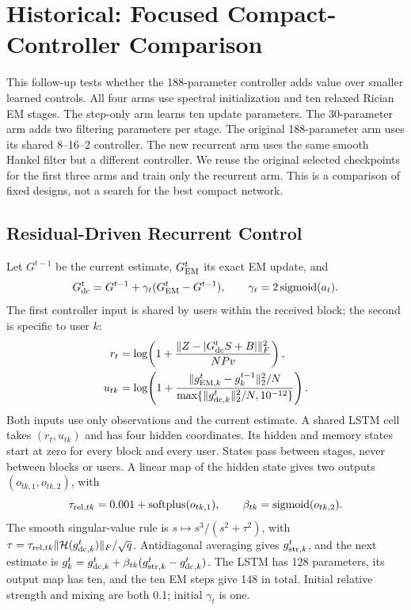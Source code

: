 \section{Historical: Focused Compact-Controller Comparison}
\label{sec:suppcompact}
This follow-up tests whether the 188-parameter controller adds value over
smaller learned controls. All four arms use spectral initialization and ten
relaxed Rician EM stages. The step-only arm learns ten update parameters.
The 30-parameter arm adds two filtering parameters per stage. The original
188-parameter arm uses its shared 8--16--2 controller. The new recurrent
arm uses the same smooth Hankel filter but a different controller. We
reuse the original selected checkpoints for the first three arms and
train only the recurrent arm. This is a comparison of fixed designs, not
a search for the best compact network.

\subsection{Residual-Driven Recurrent Control}
Let $G^{t-1}$ be the current estimate, $G_{\rm EM}^t$ its exact EM update,
and
\begin{equation}
 G_{\rm dc}^t=G^{t-1}+\gamma_t(G_{\rm EM}^t-G^{t-1}),\qquad
 \gamma_t=2\operatorname{sigmoid}(a_t).
\end{equation}
The first controller input is shared by users within the received block;
the second is specific to user $k$:
\begin{align}
 r_t&=\log\!\left(1+
 \frac{\|Z-|G_{\rm dc}^tS+B|\|_F^2}{NPv}\right),\\
 u_{tk}&=\log\!\left(1+
 \frac{\|g_{{\rm EM},k}^t-g_k^{t-1}\|_2^2/N}
 {\max\{\|g_{{\rm dc},k}^t\|_2^2/N,10^{-12}\}}\right).
\end{align}
Both inputs use only observations and the current estimate. A shared LSTM
cell takes $(r_t,u_{tk})$ and has four hidden coordinates. Its hidden and
memory states start at zero for every block and every user. States pass
between stages, never between blocks or users. A linear map of the hidden
state gives two outputs $(o_{tk,1},o_{tk,2})$, with
\begin{equation}
 \tau_{{\rm rel},tk}=0.001+\operatorname{softplus}(o_{tk,1}),\qquad
 \beta_{tk}=\operatorname{sigmoid}(o_{tk,2}).
\end{equation}
The smooth singular-value rule is $s\mapsto s^3/(s^2+\tau^2)$, with
$\tau=\tau_{{\rm rel},tk}\|\mathcal H(g_{{\rm dc},k}^t)\|_F/\sqrt q$.
Antidiagonal averaging gives $g_{{\rm str},k}^t$, and the next estimate is
$g_k^t=g_{{\rm dc},k}^t+\beta_{tk}(g_{{\rm str},k}^t-g_{{\rm dc},k}^t)$.
The LSTM has 128 parameters, its output map has ten, and the ten EM steps
give 148 in total. Initial relative strength and mixing are both 0.1;
initial $\gamma_t$ is one.


